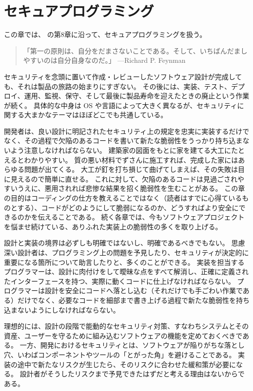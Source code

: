 \documentclass[uplatex]{jsarticle}
\begin{document}
\section{セキュアプログラミング}

この章では、\cite{Kohnfelder2021} の第8章に沿って、セキュアプログラミングを扱う。

\begin{quote}
「第一の原則は、自分をだまさないことである。そして、いちばんだましやすいのは自分自身なのだ。」 ---Richard P. Feynman
\end{quote}

セキュリティを念頭に置いて作成・レビューしたソフトウェア設計が完成しても、それは製品の旅路の始まりにすぎない。
その後には、実装、テスト、デプロイ、運用、監視、保守、そして最後に製品寿命を迎えたときの廃止という作業が続く。
具体的な中身は OS や言語によって大きく異なるが、セキュリティに関する大まかなテーマはほぼどこでも共通している。

開発者は、良い設計に明記されたセキュリティ上の規定を忠実に実装するだけでなく、その過程で欠陥のあるコードを書いて新たな脆弱性をうっかり持ち込まないよう注意しなければならない。
建築家の図面をもとに家を建てる大工にたとえるとわかりやすい。
質の悪い材料でずさんに施工すれば、完成した家にはあらゆる問題が出てくる。
大工が釘を打ち損じて曲げてしまえば、その失敗は目に見えるので簡単に直せる。
これに対して、欠陥のあるコードは見過ごされやすいうえに、悪用されれば悲惨な結果を招く脆弱性を生むことがある。
この章の目的はコーディングの仕方を教えることではなく（読者はすでに心得ているものとする）、コードがどのようにして脆弱になるのか、どうすればより安全にできるのかを伝えることである。
続く各章では、今もソフトウェアプロジェクトを悩ませ続けている、ありふれた実装上の脆弱性の多くを取り上げる。

設計と実装の境界は必ずしも明確ではないし、明確であるべきでもない。
思慮深い設計者は、プログラミング上の問題を予見したり、セキュリティが決定的に重要になる箇所について助言したりと、多くのことができる。
実装を担当するプログラマーは、設計に肉付けをして曖昧な点をすべて解消し、正確に定義されたインターフェースを持つ、実際に動くコードに仕上げなければならない。
プログラマーは設計を安全にコードへ落とし込む（それだけでも手ごわい作業である）だけでなく、必要なコードを細部まで書き上げる過程で新たな脆弱性を持ち込まないようにしなければならない。

理想的には、設計の段階で能動的なセキュリティ対策、すなわちシステムとその資産、ユーザーを守るために組み込むソフトウェアの機能を定めておくべきである。
一方、開発におけるセキュリティとは、ソフトウェアが陥りがちな落とし穴、いわばコンポーネントやツールの「とがった角」を避けることである。
実装の途中で新たなリスクが生じたら、そのリスクに合わせた緩和策が必要になる。
設計者がそうしたリスクまで予見できたはずだと考える理由はないからである。
\end{document}
